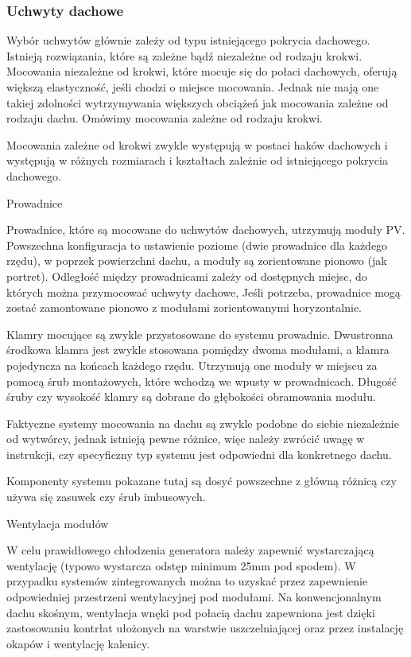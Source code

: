 \documentclass[12pt,a4paper]{article}
\begin{document}
 

\subsubsection{Uchwyty dachowe}


Wybór uchwytów głównie zależy od typu istniejącego pokrycia dachowego. 
Istnieją rozwiązania, które są zależne bądź niezależne od rodzaju 
krokwi. Mocowania niezależne od krokwi, które mocuje się do połaci 
dachowych, oferują większą elastyczność, jeśli chodzi o miejsce 
mocowania. Jednak nie mają one takiej zdolności wytrzymywania większych 
obciążeń jak mocowania zależne od rodzaju dachu. Omówimy mocowania 
zależne od rodzaju krokwi. 

Mocowania zależne od krokwi zwykle występują w postaci haków dachowych i 
występują w różnych rozmiarach i kształtach zależnie od istniejącego 
pokrycia dachowego. 

 

Prowadnice 

Prowadnice, które są mocowane do uchwytów dachowych, utrzymują moduły 
PV. Powszechna konfiguracja to ustawienie poziome (dwie prowadnice dla 
każdego rzędu), w poprzek powierzchni dachu, a moduły są zorientowane 
pionowo (jak portret). Odległość między prowadnicami zależy od 
dostępnych miejsc, do których można przymocować uchwyty dachowe, Jeśli 
potrzeba, prowadnice mogą zostać zamontowane pionowo z modułami 
zorientowanymi horyzontalnie. 

Klamry mocujące są zwykle przystosowane do systemu prowadnic. Dwustronna 
środkowa klamra jest zwykle stosowana pomiędzy dwoma modułami, a klamra 
pojedyncza na końcach każdego rzędu. Utrzymują one moduły w miejscu za 
pomocą śrub montażowych, które wchodzą we wpusty w prowadnicach. Długość 
śruby czy wysokość klamry są dobrane do głębokości obramowania modułu. 

 

Faktyczne systemy mocowania na dachu są zwykle podobne do siebie 
niezależnie od wytwórcy, jednak istnieją pewne różnice, więc należy 
zwrócić uwagę w instrukcji, czy specyficzny typ systemu jest odpowiedni 
dla konkretnego dachu. 

 

Komponenty systemu pokazane tutaj są dosyć powszechne z główną różnicą 
czy używa się zasuwek czy śrub imbusowych. 

 

Wentylacja modułów 

W celu prawidłowego chłodzenia generatora należy zapewnić wystarczającą 
wentylację (typowo wystarcza odstęp minimum 25mm pod spodem). W 
przypadku systemów zintegrowanych można to uzyskać przez zapewnienie 
odpowiedniej przestrzeni wentylacyjnej pod modułami. Na konwencjonalnym 
dachu skośnym, wentylacja wnęki pod połacią dachu zapewniona jest dzięki 
zastosowaniu kontrłat ułożonych na warstwie uszczelniającej oraz przez 
instalację okapów i wentylację kalenicy. 
\end{document}
